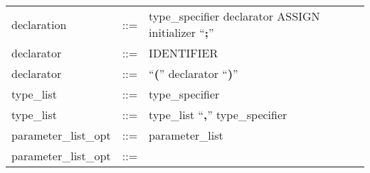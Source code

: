 \documentclass[11pt]{article}
\begin{document}
\begin{longtable}{lrl}
declaration                                & ::= &
  \begin{minipage}[t]{\rulerhs}
    \raggedright
    type\_specifier declarator ASSIGN initializer ``{\bf ;}''
  \end{minipage}                                                             \\
declarator                                 & ::= &
  \begin{minipage}[t]{\rulerhs}
    \raggedright
    IDENTIFIER
  \end{minipage}                                                             \\
declarator                                 & ::= &
  \begin{minipage}[t]{\rulerhs}
    \raggedright
    ``{\bf (}'' declarator ``{\bf )}''
  \end{minipage}                                                             \\
type\_list                                 & ::= &
  \begin{minipage}[t]{\rulerhs}
    \raggedright
    type\_specifier
  \end{minipage}                                                             \\
type\_list                                 & ::= &
  \begin{minipage}[t]{\rulerhs}
    \raggedright
    type\_list ``{\bf ,}'' type\_specifier
  \end{minipage}                                                             \\
parameter\_list\_opt                       & ::= &
  \begin{minipage}[t]{\rulerhs}
    \raggedright
    parameter\_list
  \end{minipage}                                                             \\
parameter\_list\_opt                       & ::= &
  \begin{minipage}[t]{\rulerhs}
    \raggedright
    

\end{minipage}
\end{longtable}
\end{document}
